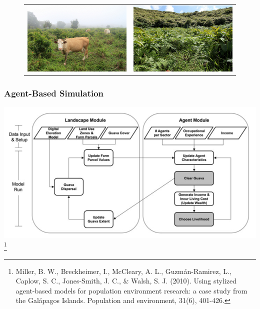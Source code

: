 \documentclass{beamer}
\begin{document}
\begin{frame}
\begin{figure}
\begin{tabular}{cc}
 \includegraphics[scale=0.2]{cow1} &   \includegraphics[scale=0.2]{invasive}
\end{tabular}
\end{figure}

\end{frame}

\begin{frame}
\frametitle{Agent-Based Simulation}
\centering
\includegraphics[scale=0.3]{abm_chart} \footnote{Miller, B. W., Breckheimer, I., McCleary, A. L., Guzm\'an-Ramirez, L., Caplow, S. C., Jones-Smith, J. C., \& Walsh, S. J. (2010). Using stylized agent-based models for population environment research: a case study from the Gal\'apagos Islands. Population and environment, 31(6), 401-426.}

\end{frame}
\end{document}
